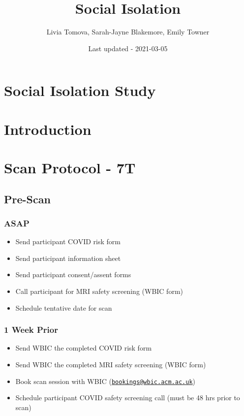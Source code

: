 \documentclass[
]{book}
\title{Social Isolation}
\author{Livia Tomova, Sarah-Jayne Blakemore, Emily Towner}
\date{Last updated - 2021-03-05}
\providecommand{\tightlist}{%
  \setlength{\itemsep}{0pt}\setlength{\parskip}{0pt}}
\begin{document}
\maketitle

{
\setcounter{tocdepth}{1}
\tableofcontents
}
\hypertarget{social-isolation-study}{%
\chapter{Social Isolation Study}\label{social-isolation-study}}

\hypertarget{intro}{%
\chapter{Introduction}\label{intro}}

\hypertarget{scan-protocol}{%
\chapter{Scan Protocol - 7T}\label{scan-protocol}}

\hypertarget{pre-scan}{%
\section{Pre-Scan}\label{pre-scan}}

\hypertarget{asap}{%
\subsection{ASAP}\label{asap}}

\begin{itemize}
\tightlist
\item
  Send participant COVID risk form
\item
  Send participant information sheet
\item
  Send participant consent/assent forms
\item
  Call participant for MRI safety screening (WBIC form)
\item
  Schedule tentative date for scan
\end{itemize}

\hypertarget{week-prior}{%
\subsection{1 Week Prior}\label{week-prior}}

\begin{itemize}
\tightlist
\item
  Send WBIC the completed COVID risk form
\item
  Send WBIC the completed MRI safety screening (WBIC form)
\item
  Book scan session with WBIC (\href{mailto:bookings@wbic.acm.ac.uk}{\nolinkurl{bookings@wbic.acm.ac.uk}})
\item
  Schedule participant COVID safety screening call (must be 48 hrs prior to scan)
\end{itemize}
\end{document}

